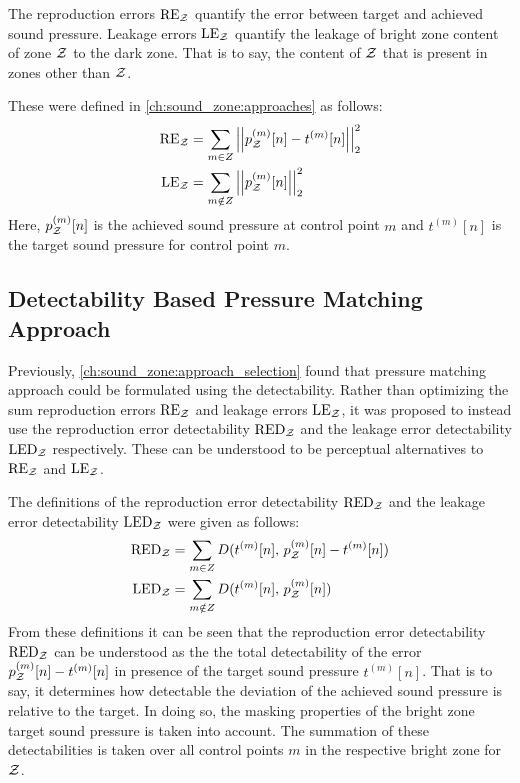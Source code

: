 The reproduction errors $\text{RE}_{\mathcal{Z}}$ quantify the error between target and achieved sound pressure. 
Leakage errors $\text{LE}_{\mathcal{Z}}$ quantify the leakage of bright zone content of zone $\mathcal{Z}$ to the dark zone.
That is to say, the content of $\mathcal{Z}$ that is present in zones other than $\mathcal{Z}$.  

These were defined in \autoref{ch:sound_zone:approaches} as follows:
\begin{align}
    \text{RE}_\zz &= \sum_{m\in Z} \norm[2][2]{p_\zz^{(m)}[n] - t^{(m)}[n]} \\
    \text{LE}_\zz &= \sum_{m\notin Z} \norm[2][2]{p_\zz^{(m)}[n]} 
\end{align}
Here, $p_{\mathcal{Z}}^{(m)}[n]$ is the achieved sound pressure at control point $m$ and $t^{(m)}[n]$ is 
the target sound pressure for control point $m$. 

\subsection{Detectability Based Pressure Matching Approach}
Previously, \autoref{ch:sound_zone:approach_selection} found that pressure matching approach could be formulated using the detectability.
Rather than optimizing the sum reproduction errors $\text{RE}_{\mathcal{Z}}$ and leakage errors $\text{LE}_{\mathcal{Z}}$, it was proposed to instead use
the reproduction error detectability $\text{RED}_{\mathcal{Z}}$ and the leakage error detectability $\text{LED}_{\mathcal{Z}}$ respectively.
These can be understood to be perceptual alternatives to $\text{RE}_{\mathcal{Z}}$ and $\text{LE}_{\mathcal{Z}}$.

The definitions of the reproduction error detectability $\text{RED}_{\mathcal{Z}}$ and the leakage error detectability $\text{LED}_{\mathcal{Z}}$ were 
given as follows:
\begin{align}
    \text{RED}_{\mathcal{Z}} &= \sum_{m\in Z} D(t^{(m)}[n],\,p_{\mathcal{Z}}^{(m)}[n] - t^{(m)}[n]) \\
    \text{LED}_{\mathcal{Z}} &= \sum_{m\notin Z} D(t^{(m)}[n],\,p_{\mathcal{Z}}^{(m)}[n])  
\end{align}
From these definitions it can be seen that the reproduction error detectability $\text{RED}_{\mathcal{Z}}$ can be understood as the 
the total detectability of the error $p_{\mathcal{Z}}^{(m)}[n] - t^{(m)}[n]$ in presence of the target sound pressure $t^{(m)}[n]$.
That is to say, it determines how detectable the deviation of the achieved sound pressure is relative to the target.
In doing so, the masking properties of the bright zone target sound pressure is taken into account.
The summation of these detectabilities is taken over all control points $m$ in the respective bright zone for $\mathcal{Z}$. 

